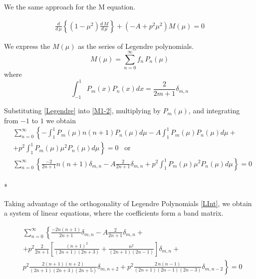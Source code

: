 We the same approach for the M equation.

\begin{equation}\label{M1-2}
\begin{split}
\frac{d}{d\,\mu}\left\{\left(1 - \mu^2\right)\frac{d\,M}{d\,\mu} \right\}  + \left( - A + p^2\mu^2   \right)M(\mu) = 0
\end{split}
\end{equation}

We express the $ M(\mu) $ as the series of Legendre polynomials.
\begin{equation}\label{Legendre}
M(\mu) = \sum_{n=0}^{\infty}{f_n\,P_n(\mu)}
\end{equation}
where 
\begin{equation}\label{LInt}
\int_{-1}^{1}{P_m(x)P_n(x)dx} = \frac{2}{2m+1}\delta_{m,n}
\end{equation}

Substituting \eqref{Legendre} into \eqref{M1-2}, multiplying by $ P_m(\mu) $, and integrating from $ -1 $ to $ 1 $ we obtain
\begin{equation}\label{3}
\begin{split}
& \sum_{n=0}^{\infty}\left\{-\int_{1}^{1}{P_m(\mu)n(n+1)P_n(\mu)d\mu } - A \int_{1}^{1}{P_m(\mu)P_n(\mu)d\mu } + \right. \\[.8em]
& + \left.p^2\int_{1}^{1}{P_m(\mu)\mu^2P_n(\mu)d\mu } \right\} = 0\,\,\,\text{    or } \\[.8em]
& \sum_{n=0}^{\infty}\left\{\frac{-2}{2n+1}n(n+1)\delta_{m,n} - A\frac{2}{2n+1}\delta_{m,n} + p^2\int_{1}^{1}{P_m(\mu)\mu^2P_n(\mu)d\mu } \right\}
= 0
\end{split}
\end{equation}\\*

Taking advantage of the orthogonality of Legendre Polynomials \eqref{LInt}, we obtain a system of linear equations, where the coefficients form a band matrix.

\begin{equation}\label{bandM}
\begin{split}
& \sum_{n=0}^{\infty}\left\{\frac{-2n(n+1)}{2n+1}\delta_{m,n} - A\frac{2}{2n+1}\delta_{m,n} + \right.\\[.8em]
& \left. + p^2\frac{2}{2n+1} \left[ \frac{(n+1)^2}{(2n+1)(2n+3)} + \frac{n^2}{(2n+1)(2n-1)}\right]\delta_{m,n} + \right. \\[.8em] 
& \left.p^2\frac{2(n+1)(n+2)}{(2n+1)(2n+3)(2n+5)}\delta_{m,n+2} +p^2 \frac{2\,n(n-1)}{(2n+1)(2n-1)(2n-3)}\delta_{m,n-2} \right\} = 0
\end{split}
\end{equation}

